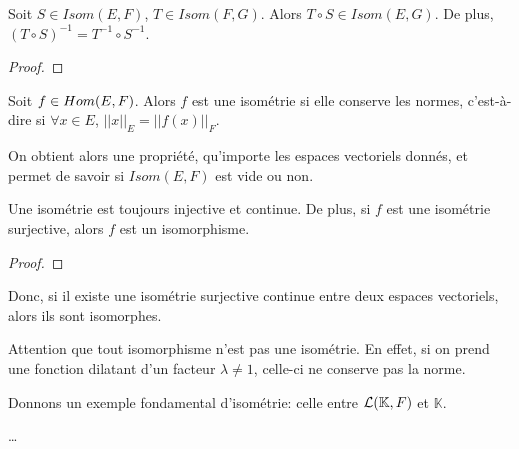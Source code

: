 \begin{proposition}
	Soit $S \in Isom(E, F)$, $T \in Isom(F, G)$.
	Alors $T \circ S \in Isom(E, G)$. De plus, $(T \circ S)^{-1} = T^{-1} \circ
	S^{-1}$.
\end{proposition}

\begin{proof}
	
\end{proof}

\begin{definition}
\label{definition_isometrie}
	Soit $f \in Hom(E, F)$.
	Alors $f$ est une isométrie si elle conserve les normes, c'est-à-dire si
	$\forall x \in E$, $||x||_{E} =  ||f(x)||_{F}$.
\end{definition}

On obtient alors une propriété, qu'importe les espaces vectoriels donnés, et
permet de savoir si $Isom(E, F)$ est vide ou non.

\begin{proposition}
	Une isométrie est toujours injective et continue. De plus, si $f$ est une
	isométrie surjective, alors $f$ est un isomorphisme.
\end{proposition}

\begin{proof}
	
\end{proof}

Donc, si il existe une isométrie surjective continue entre deux espaces
vectoriels, alors ils sont isomorphes.

Attention que tout isomorphisme n'est pas une isométrie. En effet, si on prend
une fonction dilatant d'un facteur $\lambda \neq 1$, celle-ci ne conserve pas la
norme.

Donnons un exemple fondamental d'isométrie: celle entre
$\mathcal{L}(\mathbb{K}, F)$ et $\mathbb{K}$.

\ldots
